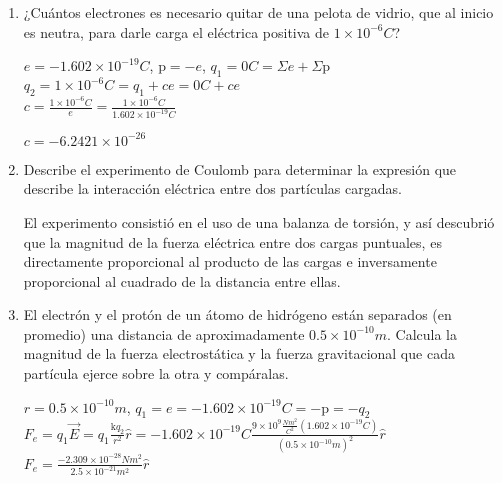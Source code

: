 \documentclass[10pt, a4paper]{article}
\begin{document}
\begin{enumerate}
\begin{center}
        \end{center}

        \item ¿Cuántos electrones es necesario quitar de una pelota de vidrio, que al inicio es neutra, para 
        darle carga el eléctrica positiva de $1 \times 10^{-6} \si{C}$?

        \begin{center}
            $e=-1.602\times 10^{-19}\si{C}$, $\mathrm{p} = -e$, $q_1=0\si{C}=\Sigma e + \Sigma\mathrm{p}$\\
            $q_2=1\times 10^{-6}\si{C}=q_1 + ce= 0\si{C} + ce$\\
            $c=\frac{1\times 10^{-6}\si{C}}{e}=\frac{1\times 10^{-6}\si{C}}{1.602\times 10^{-19}\si{C}}$

            $c=-6.2421\times 10^{-26}$
            
        \end{center}

        \item Describe el experimento de Coulomb para determinar la expresión que describe la interacción 
        eléctrica entre dos partículas cargadas.

        \begin{center}
            El experimento consistió en el uso de una balanza de torsión, y así descubrió que la magnitud 
            de la fuerza eléctrica entre dos cargas puntuales, es directamente proporcional al producto de 
            las cargas e inversamente proporcional al cuadrado de la distancia entre ellas.
        \end{center}

        \item El electrón y el protón de un átomo de hidrógeno están separados (en promedio) una distancia de 
        aproximadamente $0.5\times 10^{-10} \si{m}$. Calcula la magnitud de la fuerza electrostática y la fuerza
        gravitacional que cada partícula ejerce sobre la otra y compáralas.

        \begin{center}
            $r=0.5\times 10^{-10}\si{m}$, $q_1=e=-1.602\times 10^{-19}\si{C}=-\mathrm{p}=-q_2$\\
            $F_e=q_1\vec{E}=q_1\frac{\mathrm{k}q_2}{r^2}\hat{r}=-1.602\times 10^{-19}\si{C}\frac{9\times 10^9 \frac{\si{N}\si{m}^2}{\si{C}^2}(1.602\times 10^{-19}\si{C})}{(0.5\times 10^{-10}\si{m})^2}\hat{r}$\\
            $F_e= \frac{-2.309\times 10^{-28}\si{N}\si{m}^2}{2.5\times 10^{-21}\si{m}^2}\hat{r}$


\end{center}
\end{enumerate}
\end{document}
